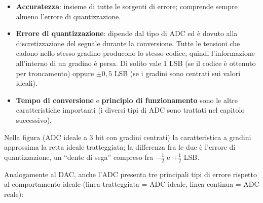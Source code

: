\begin{itemize}[leftmargin=1.5em, itemsep=2pt]
    \item \textbf{Accuratezza}: insieme di tutte le sorgenti di errore; comprende sempre
          almeno l'errore di quantizzazione.
    \item \textbf{Errore di quantizzazione}: dipende dal tipo di ADC ed è dovuto alla
          discretizzazione del segnale durante la conversione. Tutte le tensioni che cadono
          nello stesso gradino producono lo stesso codice, quindi l'informazione all'interno
          di un gradino è persa. Di solito vale $1$ LSB (se il codice è ottenuto per
          troncamento) oppure $\pm 0{,}5$ LSB (se i gradini sono centrati sui valori ideali).
    \item \textbf{Tempo di conversione} e \textbf{principio di funzionamento} sono le altre
          caratteristiche importanti (i diversi tipi di ADC sono trattati nel capitolo
          successivo).
\end{itemize}

\begin{center}
\end{center}

\noindent Nella figura (ADC ideale a 3 bit con gradini centrati) la caratteristica a gradini
approssima la retta ideale tratteggiata; la differenza fra le due è l'errore di
quantizzazione, un ``dente di sega'' compreso fra $-\frac12$ e $+\frac12$ LSB.

\medskip
\noindent Analogamente al DAC, anche l'ADC presenta tre principali tipi di errore rispetto
al comportamento ideale (linea tratteggiata = ADC ideale, linea continua = ADC reale):


